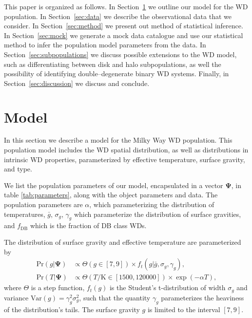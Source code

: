 \documentclass[fleqn,usenatbib]{mnras}
\newcommand{\popp}{\boldsymbol{\Psi}}
\newcommand{\Teff}{T}
\newcommand{\logg}{g}
\newcommand{\pr}{\text{Pr}}
\newcommand{\K}{\text{K}}
\begin{document}
This paper is organized as follows. In Section~\ref{sec:model} we outline our model for the WD population. In Section~\ref{sec:data} we describe the observational data that we consider. In Section~\ref{sec:method} we present out method of statistical inference. In Section~\ref{sec:mock} we generate a mock data catalogue and use our statistical method to infer the population model parameters from the data. In Section~\ref{sec:subpopulations} we discuss possible extensions to the WD model, such as differentiating between disk and halo subpopulations, as well the possibility of identifying double--degenerate binary WD systems. Finally, in Section~\ref{sec:discussion} we discuss and conclude.





\section{Model}\label{sec:model}

In this section we describe a model for the Milky Way WD population. This population model includes the WD spatial distribution, as well as distributions in intrinsic WD properties, parameterized by effective temperature, surface gravity, and type.

We list the population parameters of our model, encapsulated in a vector $\popp$, in table \ref{tab:parameters}, along with the object parameters and data. The population parameters are $\alpha$, which parameterizing the distribution of temperatures, $\bar{g}$, $\sigma_g$, $\gamma_g$ which parameterize the distribution of surface gravities, and $f_\text{DB}$ which is the fraction of DB class WDs.

The distribution of surface gravity and effective temperature are parameterized by
\begin{equation}\label{eq:T&g}
\begin{split}
	\pr(\logg | \popp) & \propto \Theta(\logg \in [7,9]) \times f_t(\logg|\bar{g},\sigma_g,\gamma_g),\\
    \pr(\Teff | \popp) & \propto \Theta(\Teff/\K \in [1500,120000]) \times \exp (-\alpha \Teff),
\end{split}
\end{equation}
where $\Theta$ is a step function, $f_t(\logg)$ is the Student's t-distribution of width $\sigma_g$ and variance $\text{Var}(g) = \gamma_g^2 \sigma_g^2$, such that the quantity $\gamma_g$ parameterizes the heaviness of the distribution's tails. The surface gravity $\logg$ is limited to the interval $[7,9]$.
\end{document}
